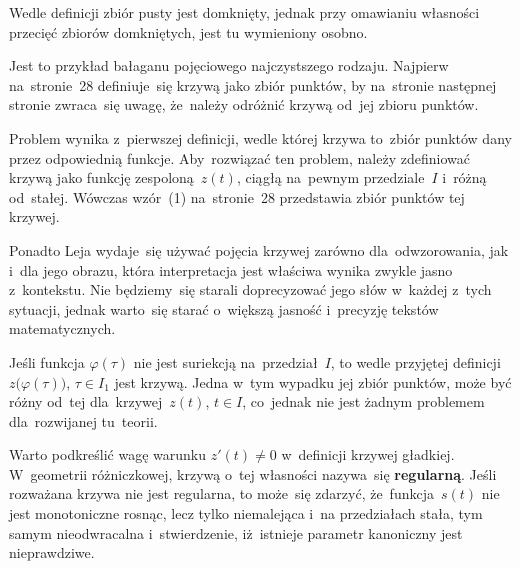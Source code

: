 \documentclass[a4paper,11pt]{article}
\numberwithin{equation}{section}
\begin{document}
\VerSpaceFour





\noindent
{} Wedle definicji zbiór pusty jest domknięty, jednak przy omawianiu
własności przecięć zbiorów domkniętych, jest tu wymieniony osobno.

\VerSpaceFour





\noindent
{} Jest to przykład bałaganu pojęciowego najczystszego rodzaju.
Najpierw na~stronie~28 definiuje~się krzywą jako zbiór punktów, by
na~stronie następnej stronie zwraca~się uwagę, że~należy odróżnić krzywą
od~jej zbioru punktów.

Problem wynika z~pierwszej definicji, wedle której krzywa to~zbiór
punktów dany przez odpowiednią funkcje. Aby~rozwiązać ten problem,
należy zdefiniować krzywą jako funkcję zespoloną~$z( t )$, ciągłą
na~pewnym przedziale~$I$ i~różną od~stałej. Wówczas wzór~(1)
na~stronie~28 przedstawia zbiór punktów tej krzywej.

Ponadto Leja wydaje~się używać pojęcia krzywej zarówno
dla~odwzorowania, jak i~dla jego obrazu, która interpretacja jest
właściwa wynika zwykle jasno z~kontekstu. Nie będziemy~się starali
doprecyzować jego słów w~każdej z~tych sytuacji, jednak warto~się
starać o~większą jasność i~precyzję tekstów matematycznych.

\VerSpaceFour





\noindent
{} Jeśli funkcja $\varphi( \tau )$ nie jest suriekcją na~przedział~$I$, to
wedle przyjętej definicji~$z\big( \varphi( \tau ) \big)$, $\tau \in I_{ 1 }$ jest krzywą.
Jedna w~tym wypadku jej zbiór punktów, może być różny od~tej
dla~krzywej~$z( t )$, $t \in I$, co~jednak nie jest żadnym problemem
dla~rozwijanej tu~teorii.

\VerSpaceFour





\noindent
{} Warto podkreślić wagę warunku $z'( t ) \neq 0$ w~definicji krzywej
gładkiej. W~geometrii różniczkowej, krzywą o~tej własności nazywa~się
\textbf{regularną}. Jeśli rozważana krzywa nie jest regularna, to może~się
zdarzyć, że~funkcja~$s( t )$ nie jest monotoniczne rosnąc, lecz tylko
niemalejąca i~na przedziałach stała, tym samym nieodwracalna
i~stwierdzenie, iż~istnieje parametr kanoniczny jest nieprawdziwe.
\end{document}

